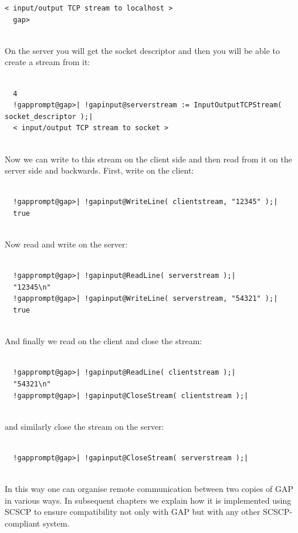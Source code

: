 \documentclass[a4paper,11pt]{report}
\begin{document}
{{\begin{Verbatim}[commandchars=!@|,fontsize=\small,frame=single,label=Example]
  < input/output TCP stream to localhost >
  gap>
  
\end{Verbatim}
 On the server you will get the socket descriptor and then you will be able to
create a stream from it: 
\begin{Verbatim}[commandchars=!@|,fontsize=\small,frame=single,label=Example]
  
  4
  !gapprompt@gap>| !gapinput@serverstream := InputOutputTCPStream( socket_descriptor );|
  < input/output TCP stream to socket >
  
\end{Verbatim}
 Now we can write to this stream on the client side and then read from it on
the server side and backwards. First, write on the client: 
\begin{Verbatim}[commandchars=!@|,fontsize=\small,frame=single,label=Example]
  
  !gapprompt@gap>| !gapinput@WriteLine( clientstream, "12345" );|
  true
  
\end{Verbatim}
 Now read and write on the server: 
\begin{Verbatim}[commandchars=!@|,fontsize=\small,frame=single,label=Example]
  
  !gapprompt@gap>| !gapinput@ReadLine( serverstream );|
  "12345\n"
  !gapprompt@gap>| !gapinput@WriteLine( serverstream, "54321" );|
  true
  
\end{Verbatim}
 And finally we read on the client and close the stream: 
\begin{Verbatim}[commandchars=!@|,fontsize=\small,frame=single,label=Example]
  
  !gapprompt@gap>| !gapinput@ReadLine( clientstream );|
  "54321\n"
  !gapprompt@gap>| !gapinput@CloseStream( clientstream );|
  
\end{Verbatim}
 and similarly close the stream on the server: 
\begin{Verbatim}[commandchars=!@|,fontsize=\small,frame=single,label=Example]
  
  !gapprompt@gap>| !gapinput@CloseStream( serverstream );|
  
\end{Verbatim}
 In this way one can organise remote communication between two copies of \textsf{GAP} in various ways. In subsequent chapters we explain how it is implemented using \textsf{SCSCP} to ensure compatibility not only with \textsf{GAP} but with any other \textsf{SCSCP}-compliant system. }

 }
\end{document}
